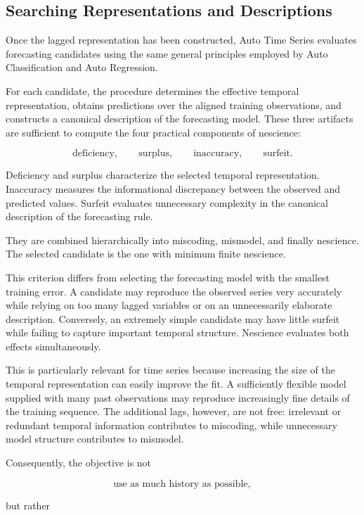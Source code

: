 \subsection*{Searching Representations and Descriptions}

Once the lagged representation has been constructed, Auto Time Series evaluates
forecasting candidates using the same general principles employed by Auto
Classification and Auto Regression.

For each candidate, the procedure determines the effective temporal
representation, obtains predictions over the aligned training observations, and
constructs a canonical description of the forecasting model. These three
artifacts are sufficient to compute the four practical components of nescience:

\[
\text{deficiency},
\qquad
\text{surplus},
\qquad
\text{inaccuracy},
\qquad
\text{surfeit}.
\]

Deficiency and surplus characterize the selected temporal representation.
Inaccuracy measures the informational discrepancy between the observed and
predicted values. Surfeit evaluates unnecessary complexity in the canonical
description of the forecasting rule.

They are combined hierarchically into miscoding, mismodel, and finally
nescience. The selected candidate is the one with minimum finite nescience.

This criterion differs from selecting the forecasting model with the smallest
training error. A candidate may reproduce the observed series very accurately
while relying on too many lagged variables or on an unnecessarily elaborate
description. Conversely, an extremely simple candidate may have little surfeit
while failing to capture important temporal structure. Nescience evaluates both
effects simultaneously.

This is particularly relevant for time series because increasing the size of
the temporal representation can easily improve the fit. A sufficiently flexible
model supplied with many past observations may reproduce increasingly fine
details of the training sequence. The additional lags, however, are not free:
irrelevant or redundant temporal information contributes to miscoding, while
unnecessary model structure contributes to mismodel.

Consequently, the objective is not

\[
\text{use as much history as possible},
\]

but rather

